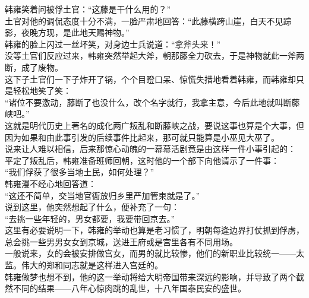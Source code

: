\begin{multicols}{\theparacolNo}
韩雍笑着问被俘土官：“这藤是干什么用的？”\\

土官对他的调侃态度十分不满，一脸严肃地回答：“此藤横跨山崖，白天不见踪影，夜晚方现，是此地天赐神物。”\\

韩雍的脸上闪过一丝坏笑，对身边士兵说道：“拿斧头来！”\\

没等土官们反应过来，韩雍突然举起大斧，朝那藤全力砍去，于是神物就此一斧两断，成了废物。\\

这下子土官们一下子炸开了锅，个个目瞪口呆、惊慌失措地看着韩雍，而韩雍却只是轻松地笑了笑：\\

“诸位不要激动，藤断了也没什么，改个名字就行，我拿主意，今后此地就叫断藤峡吧。”\\

这就是明代历史上著名的成化两广叛乱和断藤峡之战，要说这事也算是个大事，但因为如果和由此事引发的后续事件比起来，那可就只能算是小巫见大巫了。\\

说来让人难以相信，后来那惊心动魄的一幕幕活剧竟是由这样一件小事引起的：\\

平定了叛乱后，韩雍准备班师回朝，这时他的一个部下向他请示了一件事：\\

“我们俘获了很多当地土民，如何处理？”\\

韩雍漫不经心地回答道：\\

“这还不简单，交当地官衙放归乡里严加管束就是了。”\\

说到这里，他突然想起了什么，便补充了一句：\\

“去挑一些年轻的，男女都要，我要带回京去。”\\

这里有必要说明一下，韩雍的举动也算是老习惯了，明朝每逢边界打仗抓到俘虏，总会挑一些男男女女到京城，送进王府或是宫里各有不同用场。\\

一般说来，女的会被安排做宫女，而男的就比较惨，他们的新职业比较统一——太监。伟大的郑和同志就是这样进入宫廷的。\\

韩雍做梦也想不到，他的这一举动将给大明帝国带来深远的影响，并导致了两个截然不同的结果——八年心惊肉跳的乱世，十八年国泰民安的盛世。\\


\end{multicols}
